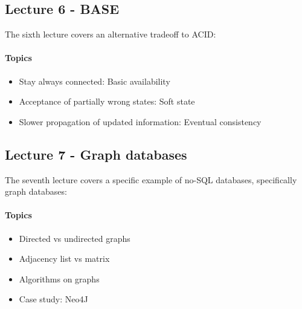 	\subsection{Lecture 6 - BASE}
		The sixth lecture covers an alternative tradeoff to ACID:

		\paragraph*{Topics}
			\begin{itemize}
				\item Stay always connected: Basic availability
				\item Acceptance of partially wrong states: Soft state
				\item Slower propagation of updated information: Eventual consistency
			\end{itemize}


	\subsection{Lecture 7 - Graph databases}
		The seventh lecture covers a specific example of no-SQL databases, specifically graph databases:

		\paragraph*{Topics}
			\begin{itemize}
				\item Directed vs undirected graphs
				\item Adjacency list vs matrix
				\item Algorithms on graphs
				\item Case study: Neo4J
			\end{itemize}

